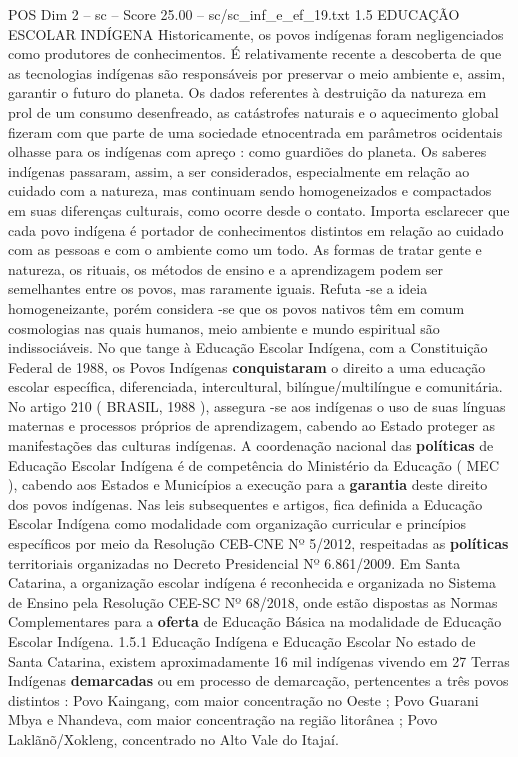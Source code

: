 \begin{textsample}{POS Dim 2 – sc – Score 25.00 – sc/sc\_inf\_e\_ef\_19.txt}  \label{ex:f2_pos_004}
1.5 EDUCAÇÃO ESCOLAR INDÍGENA Historicamente, os povos indígenas foram negligenciados como produtores de conhecimentos.
É relativamente recente a descoberta de que as tecnologias indígenas são responsáveis por preservar o meio ambiente e, assim, garantir o futuro do planeta.
Os dados referentes à destruição da natureza em prol de um consumo desenfreado, as catástrofes naturais e o aquecimento global fizeram com que parte de uma sociedade etnocentrada em parâmetros ocidentais olhasse para os indígenas com apreço : como guardiões do planeta.
Os saberes indígenas passaram, assim, a ser considerados, especialmente em relação ao cuidado com a natureza, mas continuam sendo homogeneizados e compactados em suas diferenças culturais, como ocorre desde o contato.
Importa esclarecer que cada povo indígena é portador de conhecimentos distintos em relação ao cuidado com as pessoas e com o ambiente como um todo.
As formas de tratar gente e natureza, os rituais, os métodos de ensino e a aprendizagem podem ser semelhantes entre os povos, mas raramente iguais.
Refuta -se a ideia homogeneizante, porém considera -se que os povos nativos têm em comum cosmologias nas quais humanos, meio ambiente e mundo espiritual são indissociáveis.
No que tange à Educação Escolar Indígena, com a Constituição Federal de 1988, os Povos Indígenas \textbf{conquistaram} o direito a uma educação escolar específica, diferenciada, intercultural, bilíngue/multilíngue e comunitária.
No artigo 210 ( BRASIL, 1988 ), assegura -se aos indígenas o uso de suas línguas maternas e processos próprios de aprendizagem, cabendo ao Estado proteger as manifestações das culturas indígenas.
A coordenação nacional das \textbf{políticas} de Educação Escolar Indígena é de competência do Ministério da Educação ( MEC ), cabendo aos Estados e Municípios a execução para a \textbf{garantia} deste direito dos povos indígenas.
Nas leis subsequentes e artigos, fica definida a Educação Escolar Indígena como modalidade com organização curricular e princípios específicos por meio da Resolução CEB-CNE Nº 5/2012, respeitadas as \textbf{políticas} territoriais organizadas no Decreto Presidencial Nº 6.861/2009.
Em Santa Catarina, a organização escolar indígena é reconhecida e organizada no Sistema de Ensino pela Resolução CEE-SC Nº 68/2018, onde estão dispostas as Normas Complementares para a \textbf{oferta} de Educação Básica na modalidade de Educação Escolar Indígena. 1.5.1 Educação Indígena e Educação Escolar No estado de Santa Catarina, existem aproximadamente 16 mil indígenas vivendo em 27 Terras Indígenas \textbf{demarcadas} ou em processo de demarcação, pertencentes a três povos distintos : Povo Kaingang, com maior concentração no Oeste ; Povo Guarani Mbya e Nhandeva, com maior concentração na região litorânea ; Povo Laklãnõ/Xokleng, concentrado no Alto Vale do Itajaí.

\end{textsample}
